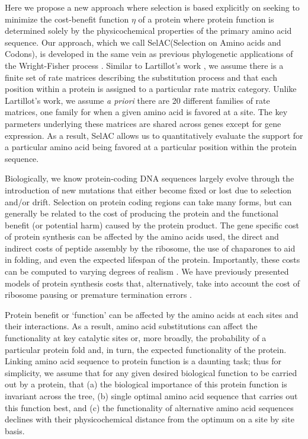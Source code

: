 \documentclass[12pt,letterpaper,fleqn]{article}
\newcommand{\PC}{physicochemical\xspace}
\newcommand{\selac}{SelAC\xspace}
\begin{document}
Here we propose a new approach where selection is based explicitly on seeking to minimize the cost-benefit function $\eta$ of a protein where protein function is determined solely by the \PC properties of the primary amino acid sequence.
Our approach, which we call \selac (Selection on Amino acids and Codons), is developed in the same vein as previous phylogenetic applications of the Wright-Fisher process \citep[e.g.~][]{MuseAndGaut1994,HalpernAndBruno1998,YangAndNielsen2008,RodrigueEtAl2005,KoshiAndGoldstein1997,KoshiEtAl1999,DimmicEtAl2000,ThorneEtAl2012,LartillotAndPhilippe2004,RodrigueAndLartillot2014}.
Similar to Lartillot's work \citep{LartillotAndPhilippe2004,RodrigueAndLartillot2014}, we assume there is a finite set of rate matrices describing the substitution process and that each position within a protein is assigned to a particular rate matrix category.
Unlike Lartillot's work, we assume \emph{a priori} there are 20 different families of rate matrices, one family for when a given amino acid is favored at a site.
The key parmeters underlying these matrices are shared across genes except for gene expression.
As a result, \selac allows us to quantitatively evaluate the support for a particular amino acid being favored at a particular position within the protein sequence.

Biologically, we know protein-coding DNA sequences largely evolve through the introduction of new mutations that either become fixed or lost due to selection and/or drift.
Selection on protein coding regions can take many forms, but can generally be related to the cost of producing the protein and the functional benefit (or potential harm) caused by the protein product.
The gene specific cost of protein synthesis can be affected by the amino acids used, the direct and indirect costs of peptide assembly by the ribosome, the use of chaparones to aid in folding, and even the expected lifespan of the protein.
Importantly, these costs can be computed to varying degrees of realism \citep[e.g.][]{Wagner2005,LynchAndMarinov2015}.
We have previously presented models of protein synthesis costs that, alternatively, take into account the cost of ribosome pausing \citep{ShahAndGilchrist2011} or premature termination errors \citep{GilchristAndWagner2006,Gilchrist2007,GilchristEtAl2009}.

Protein benefit or `function' can be affected by the amino acids at each sites and their interactions.
As a result, amino acid substitutions can affect the functionality at key catalytic sites or, more broadly, the probability of a particular protein fold and, in turn, the expected functionality of the protein.
Linking amino acid sequence to protein function is a daunting task; thus for simplicity, we assume that for any given desired biological function to be carried out by a protein, that (a) the biological importance of this protein function is invariant across the tree, (b) single optimal amino acid sequence that carries out this function best, and (c) the functionality of alternative amino acid sequences declines with their \PC distance from the optimum on a site by site basis.
\end{document}
